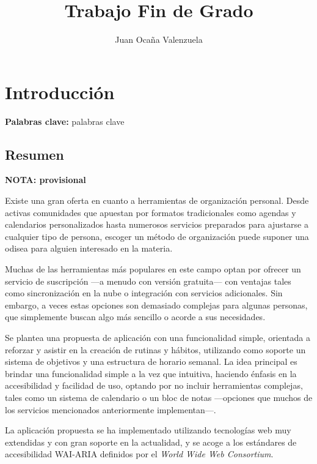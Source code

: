 \documentclass[10pt, a4paper]{aqademic}
\author{Juan Ocaña Valenzuela}
\title{Trabajo Fin de Grado}
\begin{document}
\AqMaketitle[%
	cover    = img/logo.png,
	org      = Grado en Ingeniería Informática,
	subtitle = Aplicación de gestión de rutinas semanales basada en tecnologías web
]
\tableofcontents

\chapter{Introducción}

\textbf{Palabras clave:} palabras clave

\section{Resumen}

\textbf{NOTA: provisional}

Existe una gran oferta en cuanto a herramientas de organización personal. Desde activas comunidades que apuestan por formatos tradicionales como agendas y calendarios personalizados hasta numerosos servicios preparados para ajustarse a cualquier tipo de persona, escoger un método de organización puede suponer una odisea para alguien interesado en la materia. 

\medskip

Muchas de las herramientas más populares en este campo optan por ofrecer un servicio de suscripción ---a menudo con versión gratuita--- con ventajas tales como sincronización en la nube o integración con servicios adicionales. Sin embargo, a veces estas opciones son demasiado complejas para algunas personas, que simplemente buscan algo más sencillo o acorde a sus necesidades.

\medskip

Se plantea una propuesta de aplicación con una funcionalidad simple, orientada a reforzar y asistir en la creación de rutinas y hábitos, utilizando como soporte un sistema de objetivos y una estructura de horario semanal. La idea principal es brindar una funcionalidad simple a la vez que intuitiva, haciendo énfasis en la accesibilidad y facilidad de uso, optando por no incluir herramientas complejas, tales como un sistema de calendario o un bloc de notas ---opciones que muchos de los servicios mencionados anteriormente implementan---.

\medskip

La aplicación propuesta se ha implementado utilizando tecnologías web muy extendidas y con gran soporte en la actualidad, y se acoge a los estándares de accesibilidad WAI-ARIA definidos por el \textit{World Wide Web Consortium}.
\end{document}
